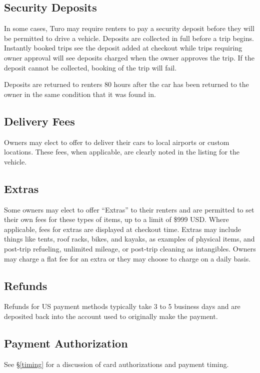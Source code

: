 \documentclass[review,12pt]{elsarticle}
\begin{document}
  \subsection{Security Deposits}
  In some cases, Turo may require renters to pay a security deposit before they will be permitted to drive a vehicle. Deposits are collected in full before a trip begins. Instantly booked trips see the deposit added at checkout while trips requiring owner approval will see deposits charged when the owner approves the trip. If the deposit cannot be collected, booking of the trip will fail.

  Deposits are returned to renters 80 hours after the car has been returned to the owner in the same condition that it was found in.

  \subsection{Delivery Fees}
  Owners may elect to offer to deliver their cars to local airports or custom locations. These fees, when applicable, are clearly noted in the listing for the vehicle.

  \subsection{Extras}
  Some owners may elect to offer ``Extras'' to their renters and are permitted to set their own fees for these types of items, up to a limit of \$999 USD. Where applicable, fees for extras are displayed at checkout time. Extras may include things like tents, roof racks, bikes, and kayaks, as examples of physical items, and post-trip refueling, unlimited mileage, or post-trip cleaning as intangibles. Owners may charge a flat fee for an extra or they may choose to charge on a daily basis.

  \subsection{Refunds}
  Refunds for US payment methods typically take 3 to 5 business days and are deposited back into the account used to originally make the payment.

  \subsection{Payment Authorization}
  See \S\ref{timing} for a discussion of card authorizations and payment timing.
\end{document}

